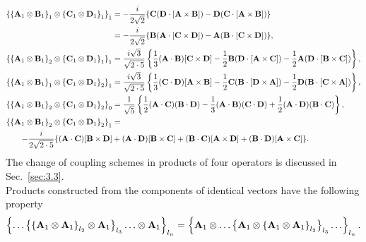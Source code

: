 \begin{align}
\left\{\left\{\mathbf{A}_{1} \otimes \mathbf{B}_{1}\right\}_{1} \otimes\left\{\mathbf{C}_{1} \otimes \mathbf{D}_{1}\right\}_{1}\right\}_{1}&=-\frac{i}{2 \sqrt{2}}\{\mathbf{C}(\mathbf{D} \cdot[\mathbf{A} \times \mathbf{B}])-\mathbf{D}(\mathbf{C} \cdot[\mathbf{A} \times \mathbf{B}])\}  \notag\\
&=-\frac{i}{2 \sqrt{2}}\{\mathbf{B}(\mathbf{A} \cdot[\mathbf{C} \times \mathbf{D}])-\mathbf{A}(\mathbf{B} \cdot[\mathbf{C} \times \mathbf{D}])\},  \label{eq:3:2:16}\\
\left\{\left\{\mathbf{A}_{1} \otimes \mathbf{B}_{1}\right\}_{2} \otimes\left\{\mathbf{C}_{1} \otimes \mathbf{D}_{1}\right\}_{1}\right\}_{1}&=\frac{i \sqrt{3}}{\sqrt{2 \cdot 5}}\left\{\frac{1}{3}(\mathbf{A} \cdot \mathbf{B})[\mathbf{C} \times \mathbf{D}]-\frac{1}{2} \mathbf{B}(\mathbf{D} \cdot[\mathbf{A} \times \mathbf{C}])-\frac{1}{2} \mathbf{A}(\mathbf{D} \cdot[\mathbf{B} \times \mathbf{C}])\right\},  \label{eq:3:2:17}\\
\left\{\left\{\mathbf{A}_{1} \otimes \mathbf{B}_{1}\right\}_{1} \otimes\left\{\mathbf{C}_{1} \otimes \mathbf{D}_{1}\right\}_{2}\right\}_{1}&=\frac{i \sqrt{3}}{\sqrt{2 \cdot 5}}\left\{\frac{1}{3}(\mathbf{C} \cdot \mathbf{D})[\mathbf{A} \times \mathbf{B}]-\frac{1}{2} \mathbf{C}(\mathbf{B} \cdot[\mathbf{D} \times \mathbf{A}])-\frac{1}{2} \mathbf{D}(\mathbf{B} \cdot[\mathbf{C} \times \mathbf{A}])\right\},  \label{eq:3:2:18}\\
\left\{\left\{\mathbf{A}_{1} \otimes \mathbf{B}_{1}\right\}_{2} \otimes\left\{\mathbf{C}_{1} \otimes \mathbf{D}_{1}\right\}_{2}\right\}_{0}&=\frac{1}{\sqrt{5}}\left\{\frac{1}{2}(\mathbf{A} \cdot \mathbf{C})(\mathbf{B} \cdot \mathbf{D})-\frac{1}{3}(\mathbf{A} \cdot \mathbf{B})(\mathbf{C} \cdot \mathbf{D})+\frac{1}{2}(\mathbf{A} \cdot \mathbf{D})(\mathbf{B} \cdot \mathbf{C})\right\},  \label{eq:3:2:19}\\
\left\{\left\{\mathbf{A}_{1} \otimes \mathbf{B}_{1}\right\}_{2} \otimes\left\{\mathbf{C}_{1} \otimes \mathbf{D}_{1}\right\}_{2}\right\}_{1}&=  \notag\\
-\frac{i}{2 \sqrt{2 \cdot 5}}\{(\mathbf{A} \cdot \mathbf{C})[\mathbf{B} \times \mathbf{D}]&+(\mathbf{A} \cdot \mathbf{D})[\mathbf{B} \times \mathbf{C}]+(\mathbf{B} \cdot \mathbf{C})[\mathbf{A} \times \mathbf{D}]+(\mathbf{B} \cdot \mathbf{D})[\mathbf{A} \times \mathbf{C}]\} . \label{eq:3:2:20}
\end{align}
The change of coupling schemes in products of four operators is discussed in Sec.~\ref{sec:3.3}.\\
Products constructed from the components of identical vectors have the following property
\begin{equation}
\left\{\ldots\left\{\left\{\mathbf{A}_{1} \otimes \mathbf{A}_{1}\right\}_{l_{2}} \otimes \mathbf{A}_{1}\right\}_{l_{3}} \ldots \otimes \mathbf{A}_{1}\right\}_{l_{n}}=\left\{\mathbf{A}_{1} \otimes \ldots\left\{\mathbf{A}_{1} \otimes\left\{\mathbf{A}_{1} \otimes \mathbf{A}_{1}\right\}_{l_{2}}\right\}_{l_{3}} \ldots\right\}_{l_{n}} .\label{eq:3:2:21}
\end{equation}
